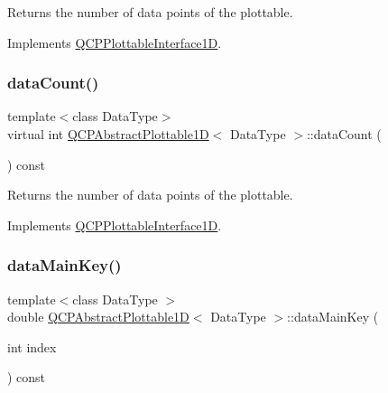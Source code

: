 Returns the number of data points of the plottable. 

Implements \hyperlink{class_q_c_p_plottable_interface1_d_a058a22c770ef4d5a0e878a7f02183da9}{Q\+C\+P\+Plottable\+Interface1D}.

\mbox{\label{class_q_c_p_abstract_plottable1_d_a75713bbfc9d4b6cacab51d76e870b497}} 
\subsubsection{\texorpdfstring{data\+Count()}{dataCount()}\hspace{0.1cm}{\footnotesize\ttfamily [2/2]}}
{\footnotesize\ttfamily template$<$class Data\+Type$>$ \\
virtual int \hyperlink{class_q_c_p_abstract_plottable1_d}{Q\+C\+P\+Abstract\+Plottable1D}$<$ Data\+Type $>$\+::data\+Count (\begin{DoxyParamCaption}{ }\end{DoxyParamCaption}) const\hspace{0.3cm}{\ttfamily [virtual]}}

Returns the number of data points of the plottable. 

Implements \hyperlink{class_q_c_p_plottable_interface1_d_a058a22c770ef4d5a0e878a7f02183da9}{Q\+C\+P\+Plottable\+Interface1D}.

\mbox{\label{class_q_c_p_abstract_plottable1_d_ab14ab428595856bf76e04499017fa8dc}} 
\subsubsection{\texorpdfstring{data\+Main\+Key()}{dataMainKey()}\hspace{0.1cm}{\footnotesize\ttfamily [1/2]}}
{\footnotesize\ttfamily template$<$class Data\+Type $>$ \\
double \hyperlink{class_q_c_p_abstract_plottable1_d}{Q\+C\+P\+Abstract\+Plottable1D}$<$ Data\+Type $>$\+::data\+Main\+Key (\begin{DoxyParamCaption}\item[{int}]{index }\end{DoxyParamCaption}) const\hspace{0.3cm}{\ttfamily [virtual]}}





